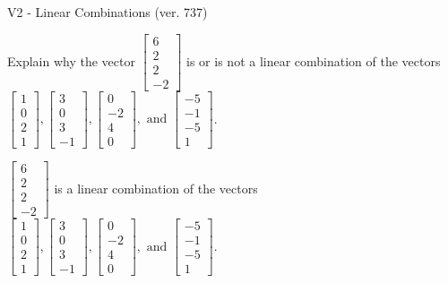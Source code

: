 \begin{exercise}
  \begin{exerciseTitle}V2 - Linear Combinations (ver. 737)\end{exerciseTitle}
  \begin{exerciseStatement}
    Explain why the vector \(\left[\begin{array}{c}
6 \\
2 \\
2 \\
-2
\end{array}\right]\)  is or is not a linear 
	combination of the vectors \(\left[\begin{array}{c}
1 \\
0 \\
2 \\
1
\end{array}\right] , \left[\begin{array}{c}
3 \\
0 \\
3 \\
-1
\end{array}\right] , \left[\begin{array}{c}
0 \\
-2 \\
4 \\
0
\end{array}\right] , \text{ and } \left[\begin{array}{c}
-5 \\
-1 \\
-5 \\
1
\end{array}\right]\).
	


  \end{exerciseStatement}
  \begin{exerciseAnswer}
   \(\left[\begin{array}{c}
6 \\
2 \\
2 \\
-2
\end{array}\right]\) 
  	 is  
	a linear combination of the vectors \(\left[\begin{array}{c}
1 \\
0 \\
2 \\
1
\end{array}\right] , \left[\begin{array}{c}
3 \\
0 \\
3 \\
-1
\end{array}\right] , \left[\begin{array}{c}
0 \\
-2 \\
4 \\
0
\end{array}\right] , \text{ and } \left[\begin{array}{c}
-5 \\
-1 \\
-5 \\
1
\end{array}\right]\).


\end{exerciseAnswer}
\end{exercise}
